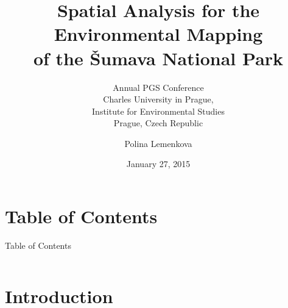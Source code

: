 \documentclass[pdflatex,compress,8pt,
	xcolor={dvipsnames,dvipsnames,svgnames,x11names,table},
	hyperref={
	breaklinks = true, 
	pdfauthor={Lemenkova Polina}, 
	pdfsubject={Preentation}, 
	pdfcreator={Lemenkova Polina}, 
	pdfproducer={Lemenkova Polina}, 
	colorlinks=true,linkcolor=blue, 
	citecolor=NavyBlue, 
	urlcolor = NavyBlue, 
	breaklinks = true}]{beamer}
\title{Spatial Analysis for the Environmental Mapping \\
of the \v{S}umava National Park }
\subtitle{\nth{6} Annual PGS Conference\\
Charles University in Prague,\\
Institute for Environmental Studies\\
Prague, Czech Republic}
\author{Polina Lemenkova}
\date{January 27, 2015}
\begin{document}
\begin{frame}
           \titlepage
\end{frame}

\section*{Table of Contents}
\begin{frame}{Table of Contents}
    \begin{columns}[onlytextwidth,T]
        \begin{column}{.45\textwidth}
            \small{\tableofcontents[sections=1-4]}
        \end{column}
        \begin{column}{.45\textwidth}
            \small{\tableofcontents[sections=5-15]}
        \end{column}
    \end{columns}
\end{frame}

\section{Introduction}
\end{document}
